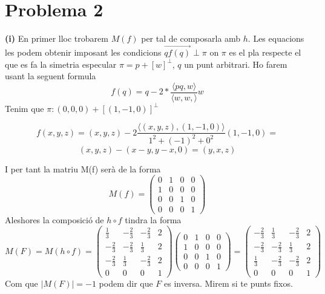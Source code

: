 \documentclass[12pt, a4papre]{article}
\begin{document}
	
	
	
	
	\newpage
	\section{Problema 2}
	\textbf{(i)} 
	En primer lloc trobarem $M(f)$ per tal de composarla amb $h$. Les equacions les podem obtenir imposant les condicions $\overrightarrow{qf(q)} \perp \pi$ on $\pi$ es
	el pla respecte el que es fa la simetria especular $\pi=p + [w]^\perp$, $q$ un punt arbitrari. Ho farem usant la seguent formula
	\[
	f(q)=q-2*\frac{\langle pq, w \rangle}{\langle w, w, \rangle} w
	\]
	Tenim que $\pi: (0,0,0)+[(1,-1,0)]^\perp$
	\begin{center}
	\[
	f(x,y,z)=(x,y,z)-2\frac{\langle (x,y,z), (1,-1,0) \rangle}{1^2+(-1)^2+0^2}(1,-1,0)=
	\]
	\[
	(x,y,z)-(x-y,y-x,0)=(y,x,z)
	\]
	\end{center}
	I per tant la matriu M(f) serà de la forma
	\[
	M(f)=
	\begin{pmatrix}
		0	&	1	&	0	&	0\\
		1	&	0	&	0	&	0\\
		0	&	0  	&	1	&	0\\
		0	&	0	& 	0	&	1
	\end{pmatrix}
	\]
	Aleshores la composició de $h\circ f$ tindra la forma
	\[
	M(F)=M(h\circ f)=
	\begin{pmatrix}
		\frac{1}{3}		&	-\frac{2}{3}	&	-\frac{2}{3}	&	2\\
		-\frac{2}{3}	&	-\frac{2}{3}	&	\frac{1}{3}		&	2\\
		-\frac{2}{3}	&	\frac{1}{3}  	&	-\frac{2}{3}	&	2\\
		0			&	0			& 	0			&	1 
	\end{pmatrix}
	\begin{pmatrix}
		0	&	1	&	0	&	0\\
		1	&	0	&	0	&	0\\
		0	&	0  	&	1	&	0\\
		0	&	0	& 	0	&	1
	\end{pmatrix}
	=
	\begin{pmatrix}
		-\frac{2}{3}	&	\frac{1}{3}		&	-\frac{2}{3}	&	2\\
		-\frac{2}{3}	&	-\frac{2}{3}	&	\frac{1}{3}		&	2\\
		\frac{1}{3}		&	-\frac{2}{3}  	&	-\frac{2}{3}	&	2\\
		0			&	0			& 	0			&	1 
	\end{pmatrix}
	\]
	Com que $|M(F)|=-1$ podem dir que $F$ es inversa. Mirem si te punts fixos.
\end{document}
